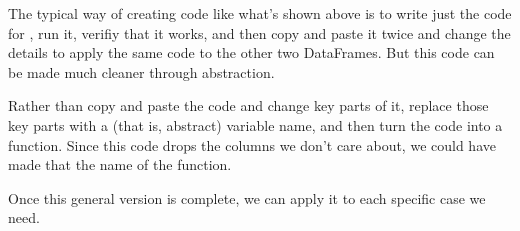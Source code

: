 \documentclass[letterpaper,10pt,english]{jupyterBook}
\begin{document}
\sphinxAtStartPar
The typical way of creating code like what’s shown above is to write just the code for , run it, verifiy that it works, and then copy and paste it twice and change the details to apply the same code to the other two DataFrames.  But this code can be made much cleaner through abstraction.

\sphinxAtStartPar
Rather than copy and paste the code and change key parts of it, replace those key parts with a  (that is, abstract) variable name, and then turn the code into a function.  Since this code drops the columns we don’t care about, we could have made that the name of the function.

\begin{sphinxVerbatim}[commandchars=\\\{\}]
    
     \PYG{p}{[}\PYG{p}{]}  
      \PYG{p}{[} 
                       \PYG{p}{]}
\end{sphinxVerbatim}

\sphinxAtStartPar
Once this general version is complete, we can apply it to each specific case we need.

\begin{sphinxVerbatim}[commandchars=\\\{\}]
  
  
  
\end{sphinxVerbatim}
\end{document}
